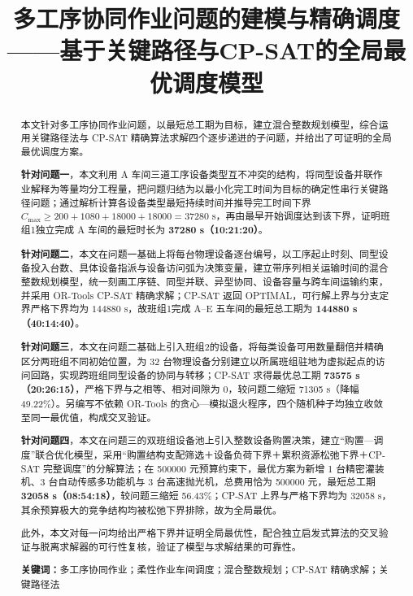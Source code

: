 \documentclass[12pt,a4paper]{article}
\title{\bfseries 多工序协同作业问题的建模与精确调度\\[0.4em]
\large ——基于关键路径与CP-SAT的全局最优调度模型}
\date{}
\begin{document}
\maketitle

\begin{abstract}
\noindent 
本文针对多工序协同作业问题，以最短总工期为目标，建立混合整数规划模型，综合运用关键路径法与 CP-SAT 精确算法求解四个逐步递进的子问题，并给出了可证明的全局最优调度方案。

\textbf{针对问题一}，本文利用 A 车间三道工序设备类型互不冲突的结构，将同型设备并联作业解释为等量均分工程量，把问题归结为以最小化完工时间为目标的确定性串行关键路径问题；通过解析计算各设备类型最短持续时间并推导完工时间下界 $C_{\max}\ge 200+1080+18000+18000=37280$ s，再由最早开始调度达到该下界，证明班组1独立完成 A 车间的最短时长为 \textbf{37280 s（10:21:20）}。

\textbf{针对问题二}，本文在问题一基础上将每台物理设备逐台编号，以工序起止时刻、同型设备投入台数、具体设备指派与设备访问弧为决策变量，建立带序列相关运输时间的混合整数规划模型，统一刻画工序链、同型并联、异型协同、设备容量与跨车间运输约束，并采用 OR-Tools CP-SAT 精确求解；CP-SAT 返回 OPTIMAL，可行解上界与分支定界严格下界均为 $144880$ s，故班组1完成 A--E 五车间的最短总工期为 \textbf{144880 s（40:14:40）}。

\textbf{针对问题三}，本文在问题二基础上引入班组2的设备，将每类设备可用数量翻倍并精确区分两班组不同初始位置，为 32 台物理设备分别建立以所属班组驻地为虚拟起点的访问回路，实现跨班组同型设备的协同与转移；CP-SAT 求得最优总工期 \textbf{73575 s（20:26:15）}，严格下界与之相等、相对间隙为 0，较问题二缩短 71305 s（降幅 49.22\%）。另编写不依赖 OR-Tools 的贪心—模拟退火程序，四个随机种子均独立收敛至同一最优值，构成交叉验证。

\textbf{针对问题四}，本文在问题三的双班组设备池上引入整数设备购置决策，建立“购置—调度”联合优化模型，采用“购置结构支配筛选＋设备负荷下界＋累积资源松弛下界＋CP-SAT 完整调度”的分解算法；在 500000 元预算约束下，最优方案为新增 1 台精密灌装机、3 台自动传感多功能机与 3 台高速抛光机，总费用恰为 500000 元，最短总工期 \textbf{32058 s（08:54:18）}，较问题三缩短 56.43\%；CP-SAT 上界与严格下界均为 32058 s，其余预算极大的竞争结构均被松弛下界排除，故为全局最优。

此外，本文对每一问均给出严格下界并证明全局最优性，配合独立启发式算法的交叉验证与脱离求解器的可行性复核，验证了模型与求解结果的可靠性。

\medskip
\noindent\textbf{关键词：}多工序协同作业；柔性作业车间调度；混合整数规划；CP-SAT 精确求解；关键路径法
\end{abstract}
\end{document}
